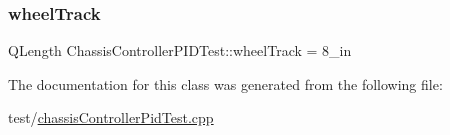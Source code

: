\mbox{\label{classChassisControllerPIDTest_a87b459510245d959a254b884ce3e2235}} 
\subsubsection{\texorpdfstring{wheelTrack}{wheelTrack}}
{\footnotesize\ttfamily Q\+Length Chassis\+Controller\+P\+I\+D\+Test\+::wheel\+Track = 8\+\_\+in\hspace{0.3cm}{\ttfamily [protected]}}



The documentation for this class was generated from the following file\+:\begin{DoxyCompactItemize}
\item 
test/\mbox{\hyperlink{chassisControllerPidTest_8cpp}{chassis\+Controller\+Pid\+Test.\+cpp}}\end{DoxyCompactItemize}
